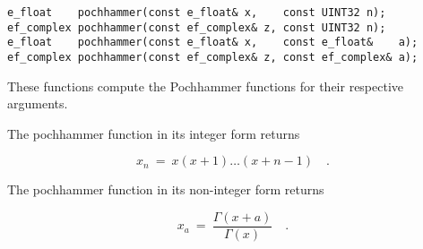 \begin{lstlisting}
e_float    pochhammer(const e_float& x,    const UINT32 n);
ef_complex pochhammer(const ef_complex& z, const UINT32 n);
e_float    pochhammer(const e_float& x,    const e_float&    a);
ef_complex pochhammer(const ef_complex& z, const ef_complex& a);
\end{lstlisting}

\vspace{6.0pt}

 These functions compute the Pochhammer functions
for their respective arguments.

\vspace{6.0pt}

 The {\courier pochhammer} function in its integer form
returns~\cite{wolframmathworld:website}

\begin{equation}
x_{n} \ = \ x(x+1)\dots(x+n-1)\quad.
\end{equation}

 The {\courier pochhammer} function in its non-integer form
returns~\cite{wolframmathworld:website}

\begin{equation}
x_{a} \ = \ \frac{\Gamma(x+a)}{\Gamma(x)}\quad.
\end{equation}


